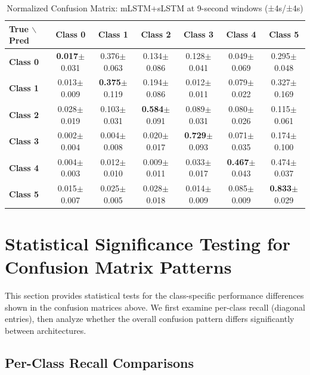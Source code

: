 \begin{table}[htbp]
\centering
\caption{Normalized Confusion Matrix: mLSTM+sLSTM at 9-second windows (±4s/±4s)}
\label{tab:app_cm_combined_9s}
\small
\setlength{\tabcolsep}{2pt}
\begin{tabular}{lcccccc}
	\toprule
	\textbf{True $\backslash$ Pred} & \textbf{Class 0} & \textbf{Class 1} & \textbf{Class 2} & \textbf{Class 3} & \textbf{Class 4} & \textbf{Class 5} \\
\midrule
	\textbf{Class 0} & \textbf{0.017}$\pm$0.031 & 0.376$\pm$0.063 & 0.134$\pm$0.086 & 0.128$\pm$0.041 & 0.049$\pm$0.069 & 0.295$\pm$0.048 \\
	\textbf{Class 1} & 0.013$\pm$0.009 & \textbf{0.375}$\pm$0.119 & 0.194$\pm$0.086 & 0.012$\pm$0.011 & 0.079$\pm$0.022 & 0.327$\pm$0.169 \\
	\textbf{Class 2} & 0.028$\pm$0.019 & 0.103$\pm$0.031 & \textbf{0.584}$\pm$0.091 & 0.089$\pm$0.031 & 0.080$\pm$0.026 & 0.115$\pm$0.061 \\
	\textbf{Class 3} & 0.002$\pm$0.004 & 0.004$\pm$0.008 & 0.020$\pm$0.017 & \textbf{0.729}$\pm$0.093 & 0.071$\pm$0.035 & 0.174$\pm$0.100 \\
	\textbf{Class 4} & 0.004$\pm$0.003 & 0.012$\pm$0.010 & 0.009$\pm$0.011 & 0.033$\pm$0.017 & \textbf{0.467}$\pm$0.043 & 0.474$\pm$0.037 \\
	\textbf{Class 5} & 0.015$\pm$0.007 & 0.025$\pm$0.005 & 0.028$\pm$0.018 & 0.014$\pm$0.009 & 0.085$\pm$0.009 & \textbf{0.833}$\pm$0.029 \\
\bottomrule
\end{tabular}
\setlength{\tabcolsep}{6pt}
\end{table}

\section{Statistical Significance Testing for Confusion Matrix Patterns}
\label{app:cm_statistical_tests}

This section provides statistical tests for the class-specific performance differences shown in the confusion matrices above. We first examine per-class recall (diagonal entries), then analyze whether the overall confusion pattern differs significantly between architectures.

\subsection{Per-Class Recall Comparisons}
\label{app:per_class_recall_tests}


